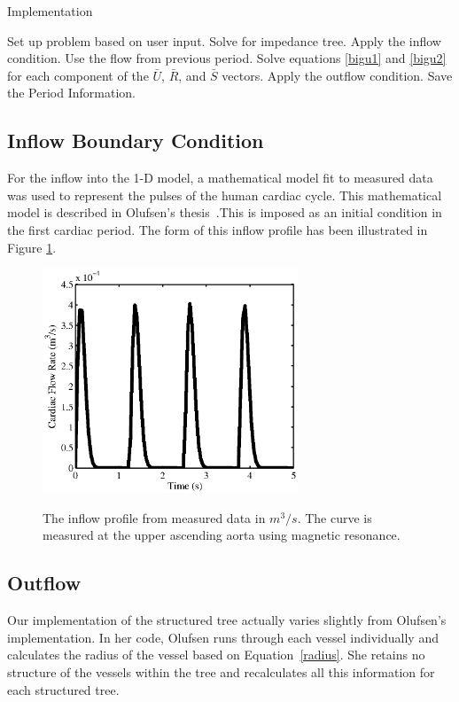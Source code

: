 \documentclass[12pt]{article}
\newcommand{\tensor}[1]{\bar{#1}}
\begin{document}
\begin{algorithm}
\label{alg:codealgorithm}
\caption{Implementation}\label{euclid}
\begin{algorithmic}[1]
\State Set up problem based on user input.
\State Solve for impedance tree.
		\State Apply the inflow condition.
	\Else
		\State Use the flow from previous period.
	\EndIf
			\State Solve equations \ref{bigu1} and \ref{bigu2} for each component of the $\tensor{U}$, $\tensor{R}$, and $\tensor{S}$ vectors.
		\EndFor
	\State Apply the outflow condition.
	\EndFor
\State Save the Period Information.
\EndFor
\end{algorithmic}
\end{algorithm}

\subsection{Inflow Boundary Condition}

For the inflow into the 1-D model, a mathematical model fit to measured data was used to represent the pulses of the human cardiac cycle. This mathematical model is described in Olufsen's thesis~\cite{olufsenthesis}.This is imposed as an initial condition in the first cardiac period. The form of this inflow profile has been illustrated in Figure \ref{inflower}.

\begin{figure}[ht]
	\centering
	\includegraphics[width=3in]{inflow}
	\label{inflower}
	\caption{The inflow profile from measured data in $m^3/s$. The curve is measured at the upper ascending aorta using magnetic resonance.}
\end{figure}


\subsection{Outflow}
Our implementation of the structured tree actually varies slightly from Olufsen's implementation. In her code, Olufsen runs through each vessel individually and calculates the radius of the vessel based on Equation~\eqref{radius}. She retains no structure of the vessels within the tree and recalculates all this information for each structured tree.
\end{document}
